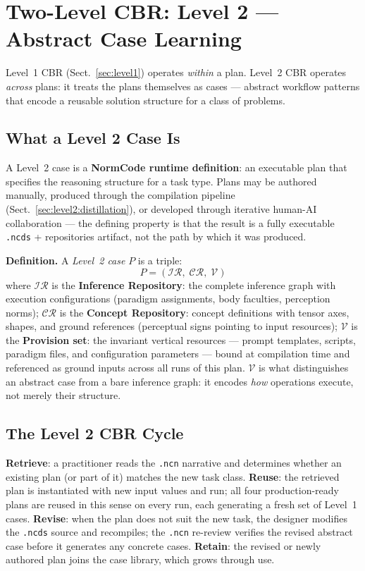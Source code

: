 \section{Two-Level CBR: Level 2 --- Abstract Case Learning}
\label{sec:level2}

Level~1 CBR (Sect.~\ref{sec:level1}) operates \textit{within} a plan. Level~2 CBR
operates \textit{across} plans: it treats the plans themselves as cases --- abstract
workflow patterns that encode a reusable solution structure for a class of problems.

\subsection{What a Level 2 Case Is}

A Level~2 case is a \textbf{NormCode runtime definition}: an executable plan that
specifies the reasoning structure for a task type. Plans may be authored manually,
produced through the compilation pipeline (Sect.~\ref{sec:level2:distillation}), or
developed through iterative human-AI collaboration --- the defining property is that
the result is a fully executable \texttt{.ncds} + repositories artifact, not the path
by which it was produced.

\textbf{Definition.} A \textit{Level~2 case} $P$ is a triple:
\begin{equation}
  P = (\mathcal{IR},\; \mathcal{CR},\; \mathcal{V})
\end{equation}
where $\mathcal{IR}$ is the \textbf{Inference Repository}: the complete inference graph
with execution configurations (paradigm assignments, body faculties, perception norms);
$\mathcal{CR}$ is the \textbf{Concept Repository}: concept definitions with tensor axes,
shapes, and ground references (perceptual signs pointing to input resources);
$\mathcal{V}$ is the \textbf{Provision set}: the invariant vertical resources --- prompt
templates, scripts, paradigm files, and configuration parameters --- bound at
compilation time and referenced as ground inputs across all runs of this plan. $\mathcal{V}$
is what distinguishes an abstract case from a bare inference graph: it encodes
\textit{how} operations execute, not merely their structure.

\subsection{The Level 2 CBR Cycle}

\textbf{Retrieve}: a practitioner reads the \texttt{.ncn} narrative and determines
whether an existing plan (or part of it) matches the new task class.
\textbf{Reuse}: the retrieved plan is instantiated with new input values and run; all
four production-ready plans are reused in this sense on every run, each generating a
fresh set of Level~1 cases. \textbf{Revise}: when the plan does not suit the new task,
the designer modifies the \texttt{.ncds} source and recompiles; the \texttt{.ncn}
re-review verifies the revised abstract case before it generates any concrete cases.
\textbf{Retain}: the revised or newly authored plan joins the case library, which grows
through use.

